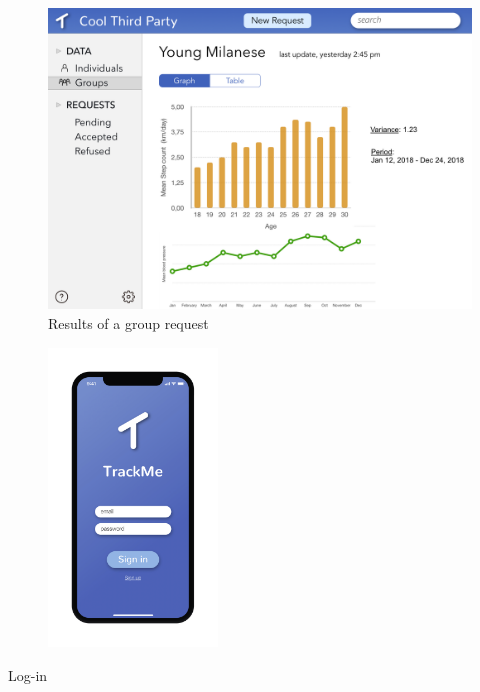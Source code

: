\begin{figure}[H]
    \centering
    \includegraphics[scale=0.2]{Pictures/Mockup/web/stats.png}
    \caption{Results of a group request }
\end{figure}

\begin{figure}[H]
    \centering
    \includegraphics[width=0.4\textwidth]{Pictures/Mockup/mobile/login.png}
    
\end{figure}
\hspace*{6.3cm}Log-in

